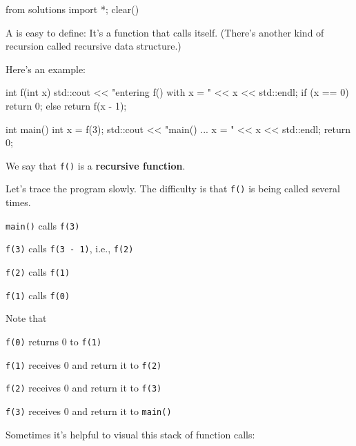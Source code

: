 \begin{python0}
from solutions import *; clear()
\end{python0}

A  is easy to define:
It's a function that calls itself.
(There's another kind of recursion called recursive data
structure.)

Here's an example:

\begin{consolethree}[escapeinside=||]
int f(int x)
{
    std::cout << "entering f() with x = " << x
              << std::endl;
    if (x == 0)
    {
        return 0;
    }
    else
    {
        return f(x - 1);
    }
}

int main()
{
    int x = f(3);
    std::cout << "main() ... x = " << x << std::endl;
    return 0;
}
\end{consolethree}

We say that \texttt{f()} is a \textbf{recursive function}.

Let's trace the program slowly. The difficulty is that
\texttt{f()} is being called several times.

\texttt{main()} calls \texttt{f(3)}

\texttt{f(3)} calls \texttt{f(3 - 1)}, i.e., \texttt{f(2)}

\texttt{f(2)} calls \texttt{f(1)}

\texttt{f(1)} calls \texttt{f(0)}

Note that

\texttt{f(0)} returns 0 to \texttt{f(1)}

\texttt{f(1)} receives 0 and return it to \texttt{f(2)}

\texttt{f(2)} receives 0 and return it to \texttt{f(3)}

\texttt{f(3)} receives 0 and return it to \texttt{main()}

Sometimes it's helpful to visual this stack of function
calls:

